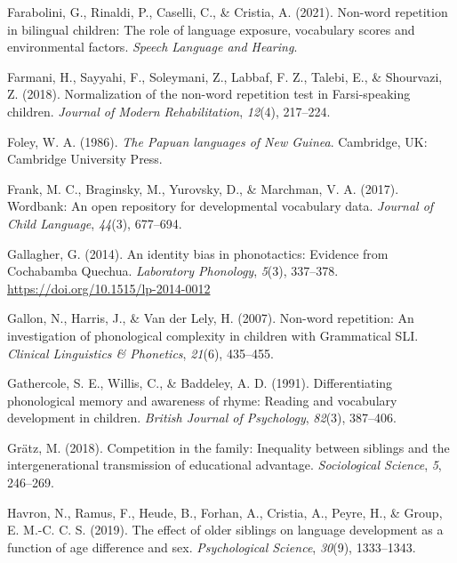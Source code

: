\documentclass[english,,man,floatsintext]{apa6}
\begin{document}
\leavevmode\hypertarget{ref-farabolini2021nonword}{}%
Farabolini, G., Rinaldi, P., Caselli, C., \& Cristia, A. (2021). Non-word repetition in bilingual children: The role of language exposure, vocabulary scores and environmental factors. \emph{Speech Language and Hearing}.

\leavevmode\hypertarget{ref-farmani2018normalization}{}%
Farmani, H., Sayyahi, F., Soleymani, Z., Labbaf, F. Z., Talebi, E., \& Shourvazi, Z. (2018). Normalization of the non-word repetition test in Farsi-speaking children. \emph{Journal of Modern Rehabilitation}, \emph{12}(4), 217--224.

\leavevmode\hypertarget{ref-foley1986papuan}{}%
Foley, W. A. (1986). \emph{The Papuan languages of New Guinea}. Cambridge, UK: Cambridge University Press.

\leavevmode\hypertarget{ref-frank2017wordbank}{}%
Frank, M. C., Braginsky, M., Yurovsky, D., \& Marchman, V. A. (2017). Wordbank: An open repository for developmental vocabulary data. \emph{Journal of Child Language}, \emph{44}(3), 677--694.

\leavevmode\hypertarget{ref-gallagher2014identity}{}%
Gallagher, G. (2014). An identity bias in phonotactics: Evidence from Cochabamba Quechua. \emph{Laboratory Phonology}, \emph{5}(3), 337--378. \url{https://doi.org/10.1515/lp-2014-0012}

\leavevmode\hypertarget{ref-gallon2007non}{}%
Gallon, N., Harris, J., \& Van der Lely, H. (2007). Non-word repetition: An investigation of phonological complexity in children with Grammatical SLI. \emph{Clinical Linguistics \& Phonetics}, \emph{21}(6), 435--455.

\leavevmode\hypertarget{ref-gathercole1991differentiating}{}%
Gathercole, S. E., Willis, C., \& Baddeley, A. D. (1991). Differentiating phonological memory and awareness of rhyme: Reading and vocabulary development in children. \emph{British Journal of Psychology}, \emph{82}(3), 387--406.

\leavevmode\hypertarget{ref-gratz2018competition}{}%
Grätz, M. (2018). Competition in the family: Inequality between siblings and the intergenerational transmission of educational advantage. \emph{Sociological Science}, \emph{5}, 246--269.

\leavevmode\hypertarget{ref-havron2019effect}{}%
Havron, N., Ramus, F., Heude, B., Forhan, A., Cristia, A., Peyre, H., \& Group, E. M.-C. C. S. (2019). The effect of older siblings on language development as a function of age difference and sex. \emph{Psychological Science}, \emph{30}(9), 1333--1343.
\end{document}
